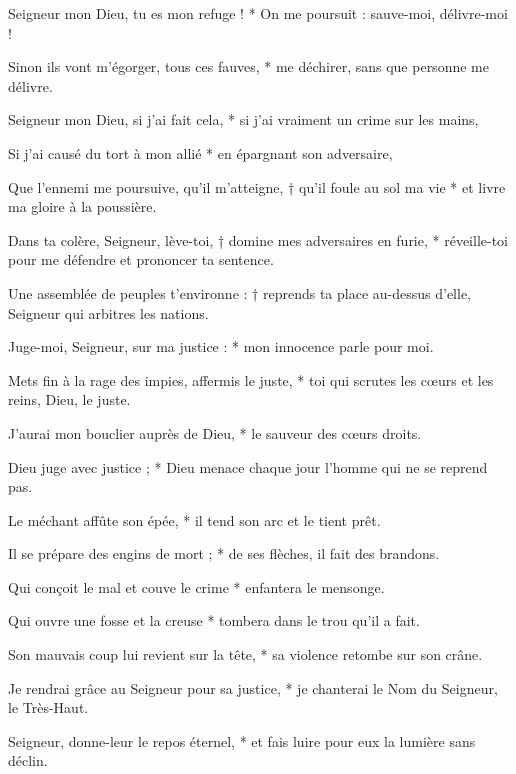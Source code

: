 \item Seigneur mon Dieu, tu es mon refuge ! * On me poursuit : sauve-moi, délivre-moi !

\item Sinon ils vont m'égorger, tous ces fauves, * me déchirer, sans que personne me délivre.

\item Seigneur mon Dieu, si j'ai fait cela, * si j'ai vraiment un crime sur les mains,

\item Si j'ai causé du tort à mon allié * en épargnant son adversaire,

\item Que l'ennemi me poursuive, qu'il m'atteigne, † qu'il foule au sol ma vie * et livre ma gloire à la poussière.

\item Dans ta colère, Seigneur, lève-toi, † domine mes adversaires en furie, * réveille-toi pour me défendre et prononcer ta sentence.

\item Une assemblée de peuples t'environne : † reprends ta place au-dessus d'elle, Seigneur qui arbitres les nations.

\item Juge-moi, Seigneur, sur ma justice : * mon innocence parle pour moi.

\item Mets fin à la rage des impies, affermis le juste, * toi qui scrutes les cœurs et les reins, Dieu, le juste.

\item J'aurai mon bouclier auprès de Dieu, * le sauveur des cœurs droits.

\item Dieu juge avec justice ; * Dieu menace chaque jour l'homme qui ne se reprend pas.

\item Le méchant affûte son épée, * il tend son arc et le tient prêt.

\item Il se prépare des engins de mort ; * de ses flèches, il fait des brandons.

\item Qui conçoit le mal et couve le crime * enfantera le mensonge.

\item Qui ouvre une fosse et la creuse * tombera dans le trou qu'il a fait.

\item Son mauvais coup lui revient sur la tête, * sa violence retombe sur son crâne.

\item Je rendrai grâce au Seigneur pour sa justice, * je chanterai le Nom du Seigneur, le Très-Haut.

\item Seigneur, donne-leur le repos éternel, * et fais luire pour eux la lumière sans déclin.